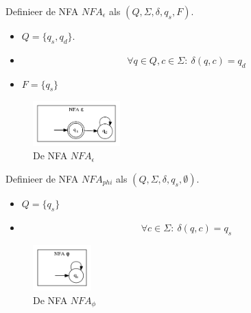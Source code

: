 \documentclass[main.tex]{subfiles}
\begin{document}
\begin{de}
  Definieer de NFA $NFA_{\epsilon}$ als $(Q, \Sigma, \delta, q_{s}, F)$.

  \begin{itemize}
  \item $Q = \{q_{s},q_{d}\}$.
  \item 
    \[ \forall q \in Q, c \in \Sigma:\ \delta(q,c) = q_{d} \]
  \item $F = \{q_{s}\}$
  \end{itemize}

  \begin{figure}[H]
    \centering
    \includegraphics[width=0.3\textwidth]{assets/nfa_epsilon.png}      
    \caption{De NFA $NFA_{\epsilon}$}
    \label{fig:nfa_epsilon}
  \end{figure}
\end{de}

\begin{de}
  Definieer de NFA $NFA_{phi}$ als $(Q, \Sigma, \delta, q_{s}, \emptyset)$.

  \begin{itemize}
  \item $Q = \{q_{s}\}$
  \item 
    \[ \forall c \in \Sigma:\ \delta(q,c) = q_{s} \]
  \end{itemize}

  \begin{figure}[H]
    \centering
    \includegraphics[width=0.2\textwidth]{assets/nfa_phi.png}      
    \caption{De NFA $NFA_{\phi}$}
    \label{fig:nfa_phi}
  \end{figure}
\end{de}
\end{document}
